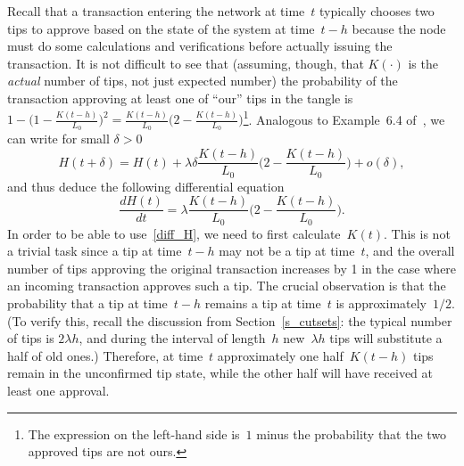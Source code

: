 \documentclass[12pt]{article}
\begin{document}
Recall that a transaction 
entering the network at time~$t$ typically 
chooses two 
tips to approve based on the state
of the system at time~$t-h$ because the node must do
some calculations and verifications before actually issuing the 
transaction. 
It is not difficult to see that
(assuming, though, that $K(\cdot)$ is the \emph{actual}
number of tips, not just expected number)
the probability of the transaction approving at least one of ``our'' tips
 in the tangle is
$1-\big(1-\frac{K(t-h)}{L_0}\big)^2
=\frac{K(t-h)}{L_0}\big(2-\frac{K(t-h)}{L_0}\big)$\footnote{The expression on the left-hand
 side is~$1$ minus the probability that the two approved tips are not ours.}.
Analogous to Example~6.4 of~\cite{Ross_m},
we can write for small $\delta>0$
\[
 H(t+\delta) = H(t) 
+ \lambda \delta\frac{K(t-h)}{L_0}\Big(2-\frac{K(t-h)}{L_0}\Big)
 + o(\delta),
\]
and thus deduce the following differential equation
\begin{equation}
\label{diff_H}
 \frac{d H(t)}{dt} = \lambda \frac{K(t-h)}{L_0}\Big(2-\frac{K(t-h)}{L_0}\Big).
\end{equation}
In order to be able to use~\eqref{diff_H}, we need to first 
calculate~$K(t)$.
This is not a trivial task since a tip at time~$t-h$ 
may not be a tip at time~$t$, 
and the overall number of tips approving the original transaction 
increases by 1 in the case where an incoming transaction 
approves such a tip.
The crucial observation
is that the probability that a tip at time~$t-h$ remains a tip
at time~$t$ is approximately~$1/2$. 
(To verify this, recall the discussion from 
Section~\ref{s_cutsets}: the typical number of tips
is $2\lambda h$, and during the interval of length~$h$
new~$\lambda h$ tips will substitute a half of old ones.)
 Therefore, at time~$t$ approximately one half~$K(t-h)$ 
tips remain in the unconfirmed tip state, while the other half
will have received at least one approval. 
\end{document}
